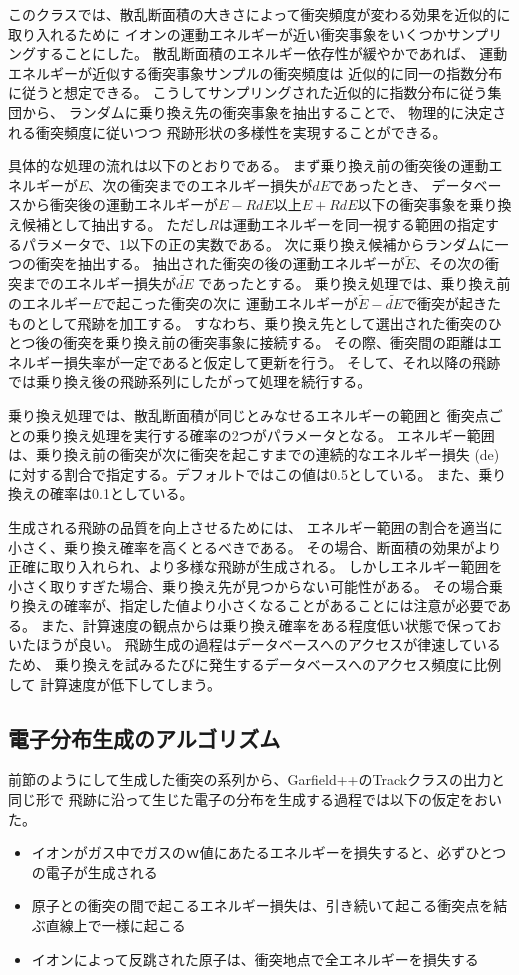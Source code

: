 \documentclass [11pt,a4paper,dvipdfmx] {jarticle}
\begin{document}
このクラスでは、散乱断面積の大きさによって衝突頻度が変わる効果を近似的に取り入れるために
イオンの運動エネルギーが近い衝突事象をいくつかサンプリングすることにした。
散乱断面積のエネルギー依存性が緩やかであれば、
運動エネルギーが近似する衝突事象サンプルの衝突頻度は
近似的に同一の指数分布に従うと想定できる。
こうしてサンプリングされた近似的に指数分布に従う集団から、
ランダムに乗り換え先の衝突事象を抽出することで、
物理的に決定される衝突頻度に従いつつ
飛跡形状の多様性を実現することができる。

具体的な処理の流れは以下のとおりである。
まず乗り換え前の衝突後の運動エネルギーが$E$、次の衝突までのエネルギー損失が$dE$であったとき、
データベースから衝突後の運動エネルギーが$E-RdE$以上$E+RdE$以下の衝突事象を乗り換え候補として抽出する。
ただし$R$は運動エネルギーを同一視する範囲の指定するパラメータで、1以下の正の実数である。
次に乗り換え候補からランダムに一つの衝突を抽出する。
抽出された衝突の後の運動エネルギーが$\tilde{E}$、その次の衝突までのエネルギー損失が$\tilde{dE}$
であったとする。
乗り換え処理では、乗り換え前のエネルギー$E$で起こった衝突の次に
運動エネルギーが$\tilde{E}-\tilde{dE}$で衝突が起きたものとして飛跡を加工する。
すなわち、乗り換え先として選出された衝突のひとつ後の衝突を乗り換え前の衝突事象に接続する。
その際、衝突間の距離はエネルギー損失率が一定であると仮定して更新を行う。
そして、それ以降の飛跡では乗り換え後の飛跡系列にしたがって処理を続行する。


乗り換え処理では、散乱断面積が同じとみなせるエネルギーの範囲と
衝突点ごとの乗り換え処理を実行する確率の2つがパラメータとなる。
エネルギー範囲は、乗り換え前の衝突が次に衝突を起こすまでの連続的なエネルギー損失 (de) 
に対する割合で指定する。デフォルトではこの値は0.5としている。
また、乗り換えの確率は0.1としている。

生成される飛跡の品質を向上させるためには、
エネルギー範囲の割合を適当に小さく、乗り換え確率を高くとるべきである。
その場合、断面積の効果がより正確に取り入れられ、より多様な飛跡が生成される。
しかしエネルギー範囲を小さく取りすぎた場合、乗り換え先が見つからない可能性がある。
その場合乗り換えの確率が、指定した値より小さくなることがあることには注意が必要である。
また、計算速度の観点からは乗り換え確率をある程度低い状態で保っておいたほうが良い。
飛跡生成の過程はデータベースへのアクセスが律速しているため、
乗り換えを試みるたびに発生するデータベースへのアクセス頻度に比例して
計算速度が低下してしまう。



\subsection{電子分布生成のアルゴリズム}
前節のようにして生成した衝突の系列から、Garfield++のTrackクラスの出力と同じ形で
飛跡に沿って生じた電子の分布を生成する過程では以下の仮定をおいた。
\begin{itemize}
    \item イオンがガス中でガスのｗ値にあたるエネルギーを損失すると、必ずひとつの電子が生成される
    \item 原子との衝突の間で起こるエネルギー損失は、引き続いて起こる衝突点を結ぶ直線上で一様に起こる
    \item イオンによって反跳された原子は、衝突地点で全エネルギーを損失する
\end{itemize}
\end{document}
